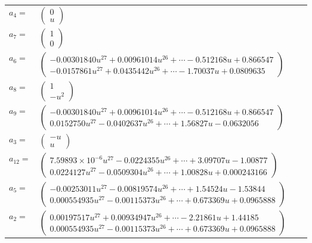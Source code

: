 \documentclass[1p]{elsarticle_modified}
\theoremstyle{definition}
\begin{document}
\begin{tabular}{m{7pt} m{180pt} m{7pt} m{180pt} }
\flushright $a_{4}=$&$\begin{pmatrix}0\\u\end{pmatrix}$ \\
\flushright $a_{7}=$&$\begin{pmatrix}1\\0\end{pmatrix}$ \\
\flushright $a_{6}=$&$\begin{pmatrix}-0.00301840 u^{27}+0.00961014 u^{26}+\cdots-0.512168 u+0.866547\\-0.0157861 u^{27}+0.0435442 u^{26}+\cdots-1.70037 u+0.0809635\end{pmatrix}$ \\
\flushright $a_{8}=$&$\begin{pmatrix}1\\- u^2\end{pmatrix}$ \\
\flushright $a_{9}=$&$\begin{pmatrix}-0.00301840 u^{27}+0.00961014 u^{26}+\cdots-0.512168 u+0.866547\\0.0152750 u^{27}-0.0402637 u^{26}+\cdots+1.56827 u-0.0632056\end{pmatrix}$ \\
\flushright $a_{3}=$&$\begin{pmatrix}- u\\u\end{pmatrix}$ \\
\flushright $a_{12}=$&$\begin{pmatrix}7.59893\times10^{-6} u^{27}-0.0224355 u^{26}+\cdots+3.09707 u-1.00877\\0.0224127 u^{27}-0.0509304 u^{26}+\cdots+1.00828 u+0.000243166\end{pmatrix}$ \\
\flushright $a_{5}=$&$\begin{pmatrix}-0.00253011 u^{27}-0.00819574 u^{26}+\cdots+1.54524 u-1.53844\\0.000554935 u^{27}-0.00115373 u^{26}+\cdots+0.673369 u+0.0965888\end{pmatrix}$ \\
\flushright $a_{2}=$&$\begin{pmatrix}0.00197517 u^{27}+0.00934947 u^{26}+\cdots-2.21861 u+1.44185\\0.000554935 u^{27}-0.00115373 u^{26}+\cdots+0.673369 u+0.0965888\end{pmatrix}$ \\

\end{tabular}
\end{document}
